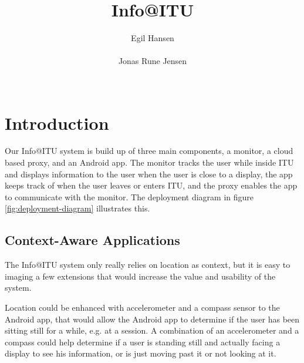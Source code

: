\documentclass{ubicomp2011}
\begin{document}
\setlength{\paperheight}{11in}
\setlength{\paperwidth}{8.5in}
\setlength{\pdfpageheight}{\paperheight}
\setlength{\pdfpagewidth}{\paperwidth}

\toappear{}

\title{Info@ITU}
\author{
  \alignauthor Egil Hansen\\
    \\
 \alignauthor Jonas Rune Jensen\\
    \\
    }

\maketitle

\section{Introduction}
Our Info@ITU system is build up of three main components, a monitor, a cloud based proxy, and an Android app. The monitor tracks the user while inside ITU and displays information to the user when the user is close to a display, the app keeps track of when the user leaves or enters ITU, and the proxy enables the app to communicate with the monitor. The deployment diagram in figure \ref{fig:deployment-diagram} illustrates this.

\subsection{Context-Aware Applications}
The Info@ITU system only really relies on location as context, but it is easy to imaging a few extensions that would increase the value and usability of the system.

Location could be enhanced with accelerometer and a compass sensor to the Android app, that would allow the Android app to determine if the user has been sitting still for a while, e.g. at a session. A combination of an accelerometer and a compass could help determine if a user is standing still and actually facing a display to see his information, or is just moving past it or not looking at it.
\end{document}
